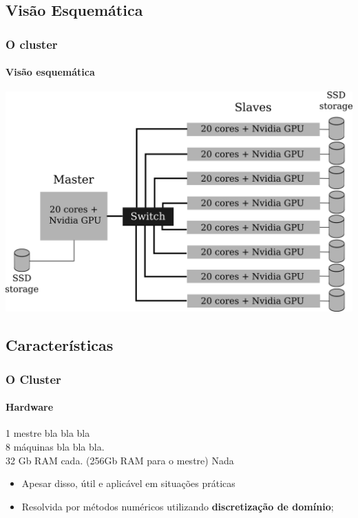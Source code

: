 \documentclass[svgnames,smaller,table]{beamer}
\begin{document}
\subsection{Visão Esquemática}
\begin{frame}[noframenumbering]
  \frametitle{O cluster}
  \framesubtitle{Visão esquemática}
  \includegraphics[scale=0.58]{figuras/cluster-topologico.png}
\end{frame}

\subsection{Características}
\begin{frame}
  \frametitle{O Cluster}
  \framesubtitle{Hardware}
  1 mestre bla bla bla\\
  8 máquinas bla bla bla.
  \\
  \vspace{0.5cm}
  32 Gb RAM cada.
  (256Gb RAM para o mestre)
  \vspace{0.5cm}
  Nada
  \begin{itemize}
  \item Apesar disso, útil e aplicável em situações práticas
  \item Resolvida por métodos numéricos utilizando \textbf{discretização de domínio};
  \end{itemize}
\end{frame}
\end{document}
